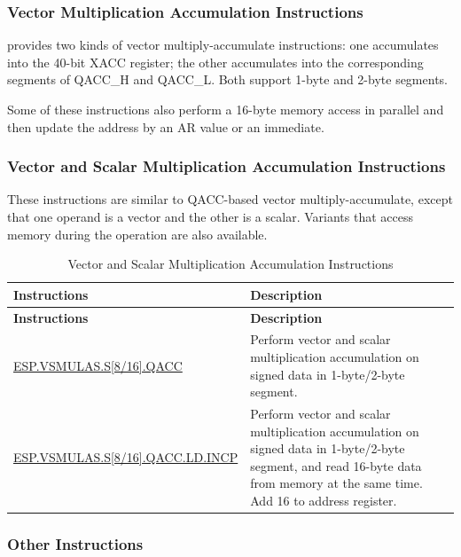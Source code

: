 \documentclass[main\_\_EN.tex]{subfiles}
\begin{document}
\subsubsection{Vector Multiplication Accumulation Instructions}

\chipname{} provides two kinds of vector multiply-accumulate instructions: one accumulates into the 40-bit XACC register; the other accumulates into the corresponding segments of QACC\_H and QACC\_L. Both support 1-byte and 2-byte segments.

Some of these instructions also perform a 16-byte memory access in parallel and then update the address by an AR value or an immediate.




\subsubsection{Vector and Scalar Multiplication Accumulation Instructions}

These instructions are similar to QACC-based vector multiply-accumulate, except that one operand is a vector and the other is a scalar. Variants that access memory during the operation are also available.

\begin{longtable}[c]{|l|m{10cm}|}
    \caption{Vector and Scalar Multiplication Accumulation Instructions}
    \label{tab:pie-vector-scalar-instructions}\\
    \hline
    \rowcolor{lightgray}
    \textbf{Instructions} & \textbf{Description} \\\hline
    \endfirsthead
    \rowcolor{lightgray}
    \textbf{Instructions} & \textbf{Description} \\\hline
    \endhead
    \endfoot

    \hyperref[instruction:ESPVSMULASS8QACC]{ESP.VSMULAS.S[8/16].QACC} & Perform vector and scalar multiplication accumulation on signed data in 1-byte/2-byte segment.
    \\\hline
    \hyperref[instruction:ESPVSMULASS8QACCLDINCP]{ESP.VSMULAS.S[8/16].QACC.LD.INCP} & Perform vector and scalar multiplication accumulation on signed data in 1-byte/2-byte segment, and read 16-byte data from memory at the same time. Add 16 to address register.
    \\\hline
\end{longtable}

\subsubsection{Other Instructions}
\end{document}
